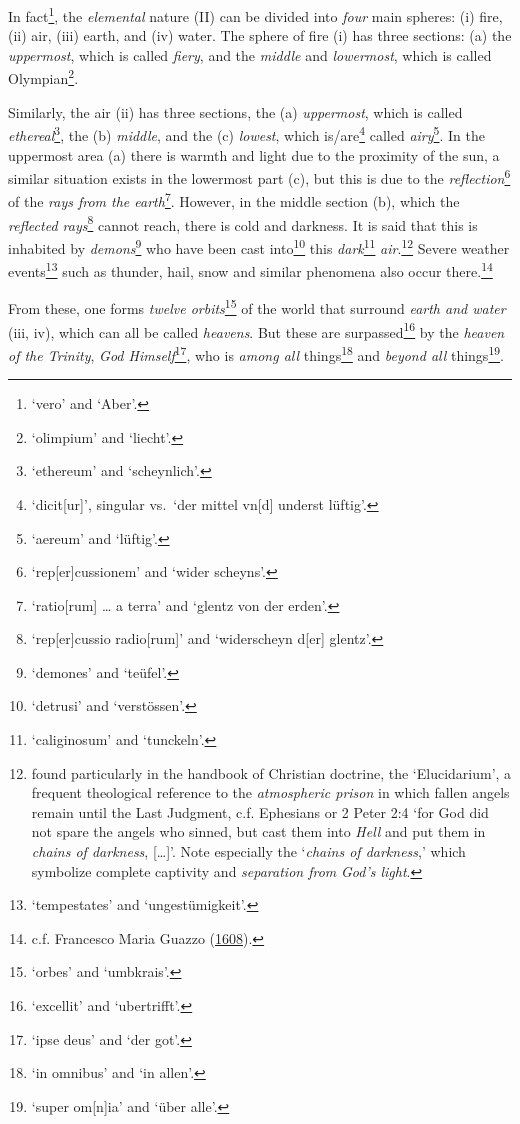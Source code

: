 \documentclass[
]{article}
\begin{document}
In fact\footnote{`vero' and `Aber'.}, the \emph{elemental} nature (II)
can be divided into \emph{four} main spheres: (i) fire, (ii) air, (iii)
earth, and (iv) water. The sphere of fire (i) has three sections: (a)
the \emph{uppermost}, which is called \emph{fiery}, and the
\emph{middle} and \emph{lowermost}, which is called Olympian\footnote{`olimpium'
  and `liecht'.}.

Similarly, the air (ii) has three sections, the (a) \emph{uppermost},
which is called \emph{ethereal}\footnote{`ethereum' and `scheynlich'.},
the (b) \emph{middle}, and the (c) \emph{lowest}, which
is/are\footnote{`dicit{[}ur{]}', singular vs.~`der mittel vn{[}d{]}
  underst lüftig'.} called \emph{airy}\footnote{`aereum' and `lüftig'.}.
In the uppermost area (a) there is warmth and light due to the proximity
of the sun, a similar situation exists in the lowermost part (c), but
this is due to the \emph{reflection}\footnote{`rep{[}er{]}cussionem' and
  `wider scheyns'.} of the \emph{rays from the earth}\footnote{`ratio{[}rum{]}
  \ldots{} a terra' and `glentz von der erden'.}. However, in the middle
section (b), which the \emph{reflected rays}\footnote{`rep{[}er{]}cussio
  radio{[}rum{]}' and `widerscheyn d{[}er{]} glentz'.} cannot reach,
there is cold and darkness. It is said that this is inhabited by
\emph{demons}\footnote{`demones' and `teüfel'.} who have been cast
into\footnote{`detrusi' and `verstössen'.} this \emph{dark}\footnote{`caliginosum'
  and `tunckeln'.} \emph{air}.\footnote{found particularly in the
  handbook of Christian doctrine, the `Elucidarium', a frequent
  theological reference to the \emph{atmospheric prison} in which fallen
  angels remain until the Last Judgment, c.f. Ephesians or 2 Peter 2:4
  `for God did not spare the angels who sinned, but cast them into
  \emph{Hell} and put them in \emph{chains of darkness}, {[}\ldots{]}'.
  Note especially the `\emph{chains of darkness},' which symbolize
  complete captivity and \emph{separation from} \emph{God's light}.}
Severe weather events\footnote{`tempestates' and `ungestümigkeit'.} such
as thunder, hail, snow and similar phenomena also occur
there.\footnote{c.f. Francesco Maria Guazzo
  (\href{https://archive.org/details/compendiummalefi00guaz/page/n2/mode/1up}{1608}).}

From these, one forms \emph{twelve orbits}\footnote{`orbes' and
  `umbkrais'.} of the world that surround \emph{earth and water} (iii,
iv), which can all be called \emph{heavens}. But these are
surpassed\footnote{`excellit' and `ubertrifft'.} by the \emph{heaven of
the Trinity}, \emph{God Himself}\footnote{`ipse deus' and `der got'.},
who is \emph{among all} things\footnote{`in omnibus' and `in allen'.}
and \emph{beyond all} things\footnote{`super om{[}n{]}ia' and `über
  alle'.}.
\end{document}
